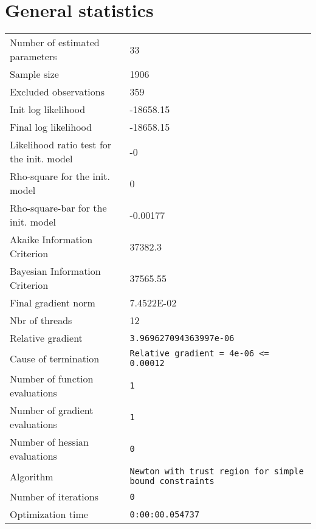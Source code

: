 



\section{General statistics}
\begin{tabular}{ll}
Number of estimated parameters & 33 \\
Sample size & 1906 \\
Excluded observations & 359 \\
Init log likelihood & -18658.15 \\
Final log likelihood & -18658.15 \\
Likelihood ratio test for the init. model & -0 \\
Rho-square for the init. model & 0 \\
Rho-square-bar for the init. model & -0.00177 \\
Akaike Information Criterion & 37382.3 \\
Bayesian Information Criterion & 37565.55 \\
Final gradient norm & 7.4522E-02 \\
Nbr of threads & 12 \\
Relative gradient & \verb$3.969627094363997e-06$ \\
Cause of termination & \verb$Relative gradient = 4e-06 <= 0.00012$ \\
Number of function evaluations & \verb$1$ \\
Number of gradient evaluations & \verb$1$ \\
Number of hessian evaluations & \verb$0$ \\
Algorithm & \verb$Newton with trust region for simple bound constraints$ \\
Number of iterations & \verb$0$ \\
Optimization time & \verb$0:00:00.054737$ \\
\end{tabular}

